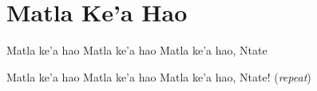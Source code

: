 \starttocol
\chapter{Matla Ke'a Hao}
\nexttocol
\hfill{\it }
\stoptocol
\starttocol
\startlines
{\sc Matla} ke'a hao 
Matla ke'a hao
Matla ke'a hao, Ntate

Matla ke'a hao
Matla ke'a hao
Matla ke'a hao, Ntate!
          \hfill({\it repeat})~~~~~~~~~
\stoplines
\nexttocol

\stoptocol
